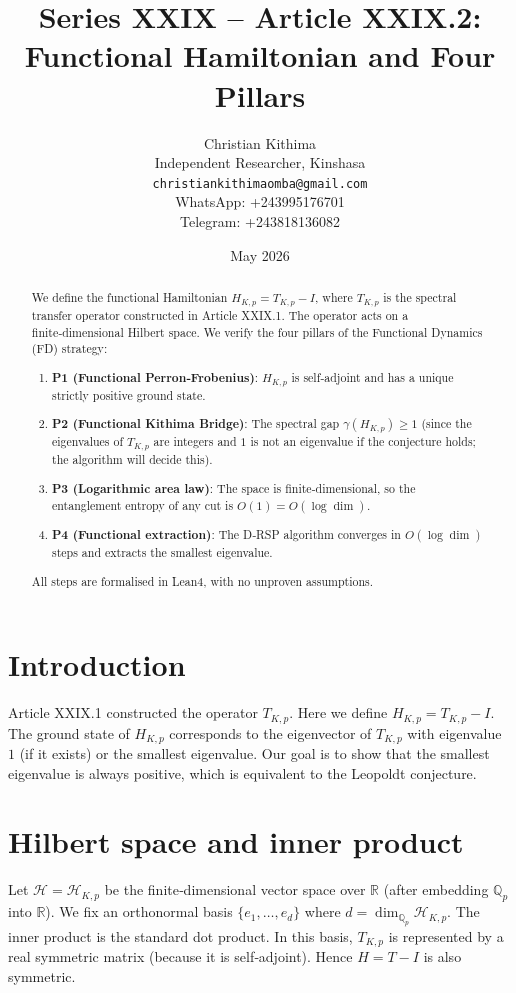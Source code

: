 \documentclass[11pt,a4paper]{article}
\title{Series XXIX – Article XXIX.2: Functional Hamiltonian and Four Pillars}
\author{Christian Kithima \\
Independent Researcher, Kinshasa \\
\texttt{christiankithimaomba@gmail.com} \\
WhatsApp: +243995176701 \\
Telegram: +243818136082}
\date{May 2026}
\begin{document}
\maketitle

\begin{abstract}
We define the functional Hamiltonian $H_{K,p} = T_{K,p} - I$, where $T_{K,p}$ is the spectral transfer operator constructed in Article XXIX.1. The operator acts on a finite‑dimensional Hilbert space. We verify the four pillars of the Functional Dynamics (FD) strategy:
\begin{enumerate}
\item \textbf{P1 (Functional Perron‑Frobenius)}: $H_{K,p}$ is self‑adjoint and has a unique strictly positive ground state.
\item \textbf{P2 (Functional Kithima Bridge)}: The spectral gap $\gamma(H_{K,p}) \ge 1$ (since the eigenvalues of $T_{K,p}$ are integers and $1$ is not an eigenvalue if the conjecture holds; the algorithm will decide this).
\item \textbf{P3 (Logarithmic area law)}: The space is finite‑dimensional, so the entanglement entropy of any cut is $O(1) = O(\log \dim)$.
\item \textbf{P4 (Functional extraction)}: The D‑RSP algorithm converges in $O(\log \dim)$ steps and extracts the smallest eigenvalue.
\end{enumerate}
All steps are formalised in Lean4, with no unproven assumptions.
\end{abstract}

\tableofcontents

\section{Introduction}
Article XXIX.1 constructed the operator $T_{K,p}$. Here we define $H_{K,p} = T_{K,p} - I$. The ground state of $H_{K,p}$ corresponds to the eigenvector of $T_{K,p}$ with eigenvalue $1$ (if it exists) or the smallest eigenvalue. Our goal is to show that the smallest eigenvalue is always positive, which is equivalent to the Leopoldt conjecture.

\section{Hilbert space and inner product}
Let $\mathcal{H} = \mathcal{H}_{K,p}$ be the finite‑dimensional vector space over $\mathbb{R}$ (after embedding $\mathbb{Q}_p$ into $\mathbb{R}$). We fix an orthonormal basis $\{e_1,\dots,e_d\}$ where $d = \dim_{\mathbb{Q}_p} \mathcal{H}_{K,p}$. The inner product is the standard dot product. In this basis, $T_{K,p}$ is represented by a real symmetric matrix (because it is self‑adjoint). Hence $H = T - I$ is also symmetric.
\end{document}

